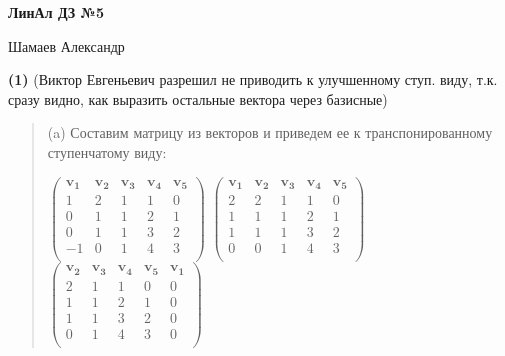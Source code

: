 \documentclass{article}
\begin{document}
\setlength{\parindent}{0pt}
\begin{Large}
    \textsf{\textbf{ЛинАл ДЗ №5}}
    
    Шамаев Александр    
\end{Large}
\vspace{1cm}

\textsf{\textbf{(1)}} (Виктор Евгеньевич разрешил не приводить к улучшенному ступ. виду, т.к. сразу видно, как выразить остальные вектора через базисные)

\begin{quote}
(a) Составим матрицу из векторов и приведем ее к транспонированному ступенчатому виду:

$\begin{pmatrix} 
\mathbf{v_1} & \mathbf{v_2} & \mathbf{v_3} & \mathbf{v_4} & \mathbf{v_5} \\
1 & 2 & 1 & 1 & 0 \\
0 & 1 & 1 & 2 & 1 \\
0 & 1 & 1 & 3 & 2 \\
-1 & 0 & 1 & 4 & 3 \\ 
\end{pmatrix}$ \Leftrightarrow
$\begin{pmatrix} 
\mathbf{v_1} & \mathbf{v_2} & \mathbf{v_3} & \mathbf{v_4} & \mathbf{v_5} \\
2 & 2 & 1 & 1 & 0 \\
1 & 1 & 1 & 2 & 1 \\
1 & 1 & 1 & 3 & 2 \\
0 & 0 & 1 & 4 & 3 \\ 
\end{pmatrix}$ \Leftrightarrow
$\begin{pmatrix} 
\mathbf{v_2} & \mathbf{v_3} & \mathbf{v_4} & \mathbf{v_5} & \mathbf{v_1}\\
2 & 1 & 1 & 0 & 0 \\
1 & 1 & 2 & 1 & 0 \\
1 & 1 & 3 & 2 & 0 \\
0 & 1 & 4 & 3 & 0 \\ 
\end{pmatrix}$ \Leftrightarrow


\end{quote}
\end{document}
